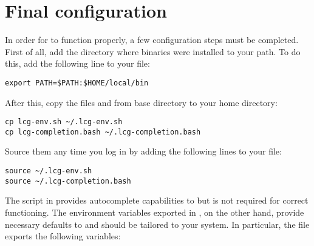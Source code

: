 \section{Final configuration}
\label{sec:configuration}
In order for \progname to function properly, a few configuration steps
must be completed. First of all, add the directory where \progname
binaries were installed to your path. To do this, add the following
line to your  file:
\begin{lstlisting}
export PATH=$PATH:$HOME/local/bin
\end{lstlisting}
After this, copy the files  and
 from \progname base directory to your
home directory:
\begin{lstlisting}
cp lcg-env.sh ~/.lcg-env.sh
cp lcg-completion.bash ~/.lcg-completion.bash
\end{lstlisting}
Source them any time you log in by adding the following lines to your
 file:
\begin{lstlisting}
source ~/.lcg-env.sh
source ~/.lcg-completion.bash
\end{lstlisting}
The script in  provides autocomplete
capabilities to \progname but is not required for correct
functioning. The environment variables exported in
, on the other hand, provide necessary defaults
to \progname and should be tailored to your system. In particular, the
file exports the following variables:
